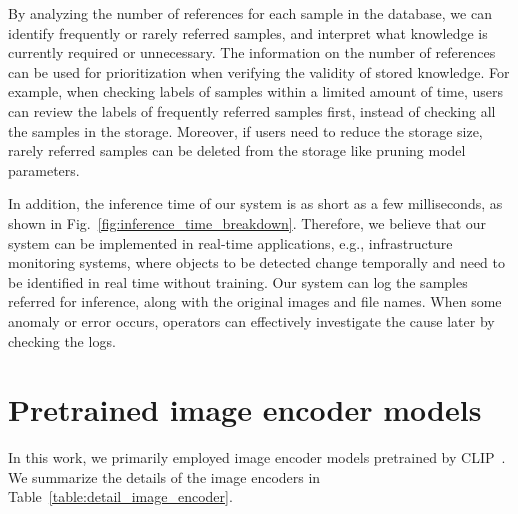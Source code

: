 \documentclass[runningheads]{llncs}
\begin{document}
By analyzing the number of references for each sample in the database, we can identify frequently or rarely referred samples, and interpret what knowledge is currently required or unnecessary.
The information on the number of references can be used for prioritization when verifying the validity of stored knowledge.
For example, when checking labels of samples within a limited amount of time, users can review the labels of frequently referred samples first, instead of checking all the samples in the storage.
Moreover, if users need to reduce the storage size, rarely referred samples can be deleted from the storage like pruning model parameters.


In addition, the inference time of our system is as short as a few milliseconds, as shown in Fig.~\ref{fig:inference_time_breakdown}.
Therefore, we believe that our system can be implemented in real-time applications,
e.g., infrastructure monitoring systems,
where objects to be detected change temporally and need to be identified in real time without training.
Our system can log the samples referred for inference, along with the original images and file names.
When some anomaly or error occurs, operators can effectively investigate the cause later by checking the logs.


\section{Pretrained image encoder models}
\label{sec:details_image_encoders}

In this work, we primarily employed image encoder models pretrained by CLIP~\cite{CLIP}. 
We summarize the details of the image encoders in Table~\ref{table:detail_image_encoder}.
\end{document}
